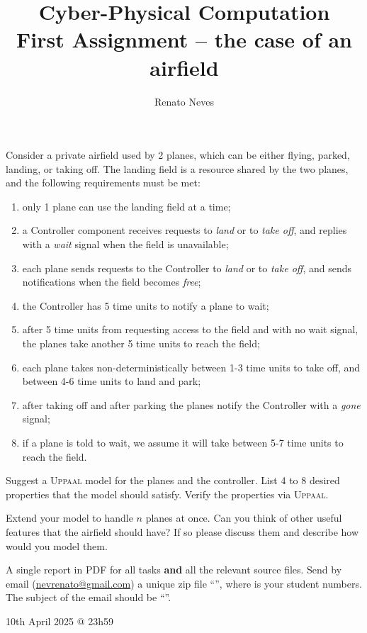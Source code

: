 \documentclass[11pt]{article}
\date{}
\theoremstyle{myplain}
\theoremstyle{definition} %
\begin{document}
 
 
\title{Cyber-Physical Computation
\\ {\small First Assignment -- the case of an airfield}}
\author{Renato Neves}
 
\maketitle

Consider a private airfield used by 2 planes, which can be either flying,
parked, landing, or taking off. The landing field is a resource shared by the
two planes, and the following requirements must be met:
\begin{enumerate}
  \item only 1 plane can use the landing field at a time;
  \item a Controller component receives requests to \emph{land} or to \emph{take off}, and replies with a \emph{wait} signal when the field is unavailable;
  \item each plane sends requests to the Controller to \emph{land} or to \emph{take off}, and sends notifications when the field becomes \emph{free};
  \item the Controller has 5 time units to notify a plane to wait;
  \item after 5 time units from requesting access to the field and with no wait signal, the planes take another 5 time units to reach the field;
  \item each plane takes non-deterministically between 1-3 time units to take off, and between 4-6 time units to land and park;
  \item after taking off and after parking the planes notify the Controller with a \emph{gone} signal;
  \item if a plane is told to wait, we assume it will take between 5-7 time units to reach the field.
\end{enumerate}

\noindent
Suggest a \textsc{Uppaal} model for the planes and the controller. List 4 to 8
desired properties that the model should satisfy. Verify the properties via
\textsc{Uppaal}.

\smallskip
{} Extend your model to handle $n$ planes at
once. Can you think of other useful features that the airfield should have? If
so please discuss them and describe how would you model them.

\bigskip

\begin{mdframed}  
   A single report in PDF for all tasks 
  \textbf{and} all the relevant source files. 
  Send by email
  (\underline{nevrenato@gmail.com}) a unique zip file
  ``'', where  is your
  student numbers. The subject of the email should be ``''.

 10th April 2025 @ 23h59
\end{mdframed}
\end{document}
